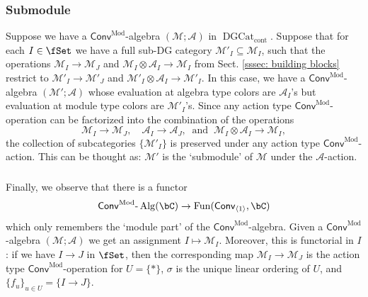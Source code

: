 \documentclass[10pt]{amsart}
\newcommand{\sssec}{\subsubsection}
\theoremstyle{remark}
\newcommand{\te}{\text}
\newcommand{\on}{\operatorname}
\newcommand{\cA}{\mathcal{A}}
\newcommand{\cM}{\mathcal{M}}
\newcommand{\DGcat}{\on{DGCat}_{\on{cont}}}
\newcommand{\lAlg}{\text{-}\on{Alg}}
\newcommand{\Fun}{\on{Fun}}
\newcommand{\Conv}{\mathsf{Conv}}
\newcommand{\ConvMod}{\mathsf{Conv}^{\on{Mod}}}
\begin{document}
\sssec{Submodule}\label{sssec: submodule construction}
Suppose we have a $\ConvMod$-algebra $(\cM;\cA)$ in $\DGcat$. Suppose that for each $I\in\fSet$ we have a full sub-DG category $\cM'_{I}\subseteq \cM_I$, such that the operations $\cM_I\rightarrow \cM_J$ and $\cM_I\otimes \cA_I\rightarrow \cM_I$ from Sect. \ref{sssec: building blocks} restrict to $\cM'_I\rightarrow\cM'_J$ and $\cM'_I\otimes \cA_I\rightarrow \cM'_I$. In this case, we have a $\ConvMod$-algebra $(\cM';\cA)$ whose evaluation at algebra type colors are $\cA_I$'s but evaluation at module type colors are $\cM'_I$'s. Since any action type $\ConvMod$-operation can be factorized into the combination of the operations
\[\cM_I\rightarrow \cM_J,\quad \cA_I\rightarrow \cA_J, \ \te{ and } \ \cM_I\otimes \cA_I\rightarrow \cM_I,\]
 the collection of subcategories $\{\cM'_I\}$ is preserved under any action type $\ConvMod$-action. This can be thought as: $\cM'$ is the `submodule' of $\cM$ under the $\cA$-action.

\sssec{}\label{sssec: ConvMod to Conv1}
Finally, we observe that there is a functor
\begin{equation*}
    \ConvMod\lAlg(\bC)\rightarrow \Fun(\Conv_{\langle 1\rangle},\bC)
\end{equation*}
which only remembers the `module part' of the $\ConvMod$-algebra. Given a $\ConvMod$-algebra $(\cM;\cA)$ we get an assignment $I\mapsto \cM_I$. Moreover, this is functorial in $I$: if we have $I\rightarrow J$ in $\fSet$, then the corresponding map $\cM_I\rightarrow \cM_J$ is the action type $\ConvMod$-operation for $U=\{*\}$, $\sigma$ is the unique linear ordering of $U$, and $\{f_u\}_{u\in U}=\{I\rightarrow J\}$.
\end{document}
